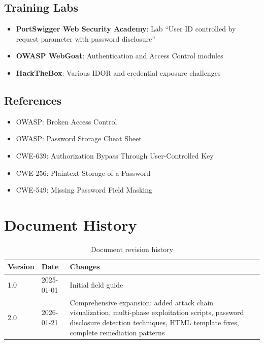 \documentclass[11pt,letterpaper]{article}
\begin{document}
\subsection{Training Labs}

\begin{itemize}
  \item \textbf{PortSwigger Web Security Academy}: Lab ``User ID controlled by request parameter with password disclosure''
  \item \textbf{OWASP WebGoat}: Authentication and Access Control modules
  \item \textbf{HackTheBox}: Various IDOR and credential exposure challenges
\end{itemize}

\subsection{References}

\begin{itemize}
  \item OWASP: Broken Access Control
  \item OWASP: Password Storage Cheat Sheet
  \item CWE-639: Authorization Bypass Through User-Controlled Key
  \item CWE-256: Plaintext Storage of a Password
  \item CWE-549: Missing Password Field Masking
\end{itemize}

\section{Document History}

\begin{table}[h]
\centering
\begin{tabular}{@{}llp{8cm}@{}}
\toprule
\textbf{Version} & \textbf{Date} & \textbf{Changes} \\
\midrule
1.0 & 2025-01-01 & Initial field guide \\
2.0 & 2026-01-21 & Comprehensive expansion: added attack chain visualization, multi-phase exploitation scripts, password disclosure detection techniques, HTML template fixes, complete remediation patterns \\
\bottomrule
\end{tabular}
\caption{Document revision history}
\end{table}
\end{document}
